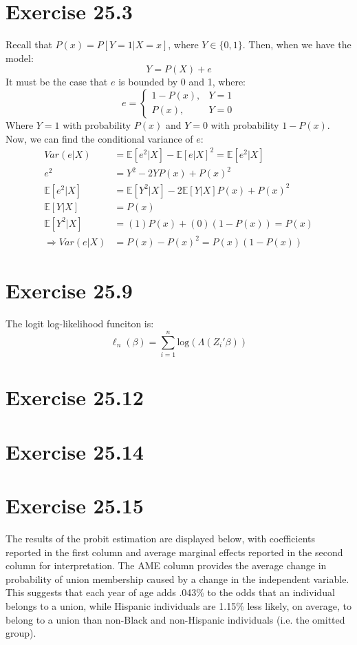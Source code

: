 \documentclass{article}
\newcommand{\sumn}{\sum_{i=1}^{n}}
\newcommand{\loge}[1]{\text{log}\left(#1\right)}
\newcommand{\E}[1]{\mathbb{E}\left[#1\right]}%
\begin{document}
\section*{Exercise 25.3}
Recall that ${P(x)=P[Y=1|X=x]}$, where ${Y\in\{0,1\}}$. Then, when we have the model:
\[
	Y = P(X) + e
\]
It must be the case that $e$ is bounded by 0 and 1, where:
\[
	e =	\begin{cases}
			1-P(x),	&Y = 1	\\
			P(x),	&Y = 0
		\end{cases}
\]
Where $Y=1$ with probability $P(x)$ and ${Y=0}$ with probability ${1-P(x)}$. Now, we can find the conditional variance of $e$:
\begin{align*}
				Var(e|X)	&= \E{e^2|X} - \E{e|X}^2 = \E{e^2|X}		\\
				e^2 		&= Y^2 - 2YP(x) + P(x)^2					\\
				\E{e^2|X}	&= \E{Y^2|X} - 2\E{Y|X}P(x) + P(x)^2		\\
				\E{Y|X}		&= P(x)										\\
				\E{Y^2|X}	&= (1)P(x) + (0)(1-P(x)) = P(x)				\\
	\Rightarrow Var(e|X)	&= P(x) - P(x)^2 = P(x)\left(1-P(x)\right)
\end{align*}


\section*{Exercise 25.9}
The logit log-likelihood funciton is:
\[
	\ell_n(\beta) = \sumn\loge{\Lambda\left(Z_i'\beta\right)}
\]


\section*{Exercise 25.12}


\section*{Exercise 25.14}


\section*{Exercise 25.15}
The results of the probit estimation are displayed below, with coefficients reported in the first column and average marginal effects reported in the second column for interpretation. The AME column provides the average change in probability of union membership caused by a change in the independent variable. This suggests that each year of age adds .043\% to the odds that an individual belongs to a union, while Hispanic individuals are 1.15\% less likely, on average, to belong to a union than non-Black and non-Hispanic individuals (i.e. the omitted group).
\end{document}
